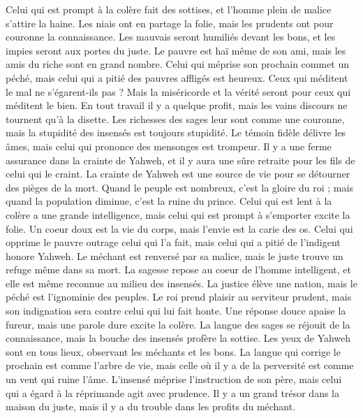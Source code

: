 \begin{multicols}{2}
Celui qui est prompt à la colère fait des sottises, et l'homme plein de malice s’attire la haine.
Les niais ont en partage la folie, mais les prudents ont pour couronne la connaissance.
Les mauvais seront humiliés devant les bons, et les impies seront aux portes du juste.
Le pauvre est haï même de son ami, mais les amis du riche sont en grand nombre.
Celui qui méprise son prochain commet un péché, mais celui qui a pitié des pauvres affligés est heureux.
Ceux qui méditent le mal ne s’égarent-ils pas ? Mais la miséricorde et la vérité seront pour ceux qui méditent le bien.
En tout travail il y a quelque profit, mais les vains discours ne tournent qu'à la disette.
Les richesses des sages leur sont comme une couronne, mais la stupidité des insensés est toujours stupidité.
Le témoin fidèle délivre les âmes, mais celui qui prononce des mensonges est trompeur.
Il y a une ferme assurance dans la crainte de Yahweh, et il y aura une sûre retraite pour les fils de celui qui le craint.
La crainte de Yahweh est une source de vie pour se détourner des pièges de la mort.
Quand le peuple est nombreux, c’est la gloire du roi ; mais quand la population diminue, c'est la ruine du prince.
Celui qui est lent à la colère a une grande intelligence, mais celui qui est prompt à s’emporter excite la folie.
Un coeur doux est la vie du corps, mais l'envie est la carie des os.
Celui qui opprime le pauvre outrage celui qui l'a fait, mais celui qui a pitié de l’indigent honore Yahweh.
Le méchant est renversé par sa malice, mais le juste trouve un refuge même dans sa mort.
La sagesse repose au coeur de l'homme intelligent, et elle est même reconnue au milieu des insensés.
La justice élève une nation, mais le péché est l'ignominie des peuples.
Le roi prend plaisir au serviteur prudent, mais son indignation sera contre celui qui lui fait honte.
\VerseOne{}Une réponse douce apaise la fureur, mais une parole dure excite la colère.
La langue des sages se réjouit de la connaissance, mais la bouche des insensés profère la sottise.
Les yeux de Yahweh sont en tous lieux, observant les méchants et les bons.
La langue qui corrige le prochain est comme l'arbre de vie, mais celle où il y a de la perversité est comme un vent qui ruine l’âme.
L’insensé méprise l'instruction de son père, mais celui qui a égard à la réprimande agit avec prudence.
Il y a un grand trésor dans la maison du juste, mais il y a du trouble dans les profits du méchant.

\end{multicols}
